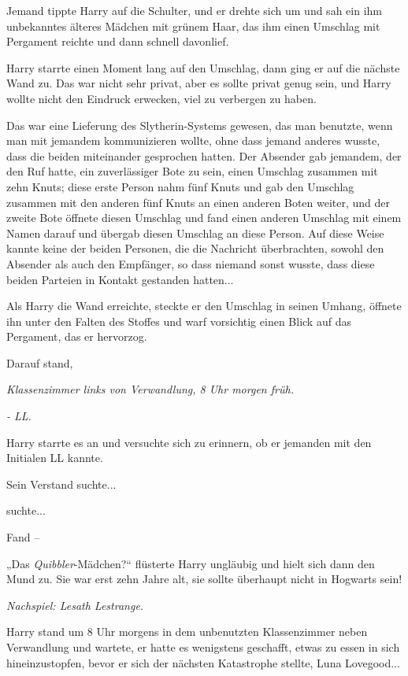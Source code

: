 {Jemand tippte Harry auf die Schulter, und er drehte sich um und sah ein ihm unbekanntes älteres Mädchen mit grünem Haar, das ihm einen Umschlag mit Pergament reichte und dann schnell davonlief.

Harry starrte einen Moment lang auf den Umschlag, dann ging er auf die nächste Wand zu. Das war nicht sehr privat, aber es sollte privat genug sein, und Harry wollte nicht den Eindruck erwecken, viel zu verbergen zu haben.

Das war eine Lieferung des Slytherin-Systems gewesen, das man benutzte, wenn man mit jemandem kommunizieren wollte, ohne dass jemand anderes wusste, dass die beiden miteinander gesprochen hatten. Der Absender gab jemandem, der den Ruf hatte, ein zuverlässiger Bote zu sein, einen Umschlag zusammen mit zehn Knuts; diese erste Person nahm fünf Knuts und gab den Umschlag zusammen mit den anderen fünf Knuts an einen anderen Boten weiter, und der zweite Bote öffnete diesen Umschlag und fand einen anderen Umschlag mit einem Namen darauf und übergab diesen Umschlag an diese Person. Auf diese Weise kannte keine der beiden Personen, die die Nachricht überbrachten, sowohl den Absender als auch den Empfänger, so dass niemand sonst wusste, dass diese beiden Parteien in Kontakt gestanden hatten...

Als Harry die Wand erreichte, steckte er den Umschlag in seinen Umhang, öffnete ihn unter den Falten des Stoffes und warf vorsichtig einen Blick auf das Pergament, das er hervorzog.

Darauf stand,

\emph{\emph{Klassenzimmer links von Verwandlung, 8 Uhr morgen} \emph{früh.}}

\emph{\emph{- LL.}}

Harry starrte es an und versuchte sich zu erinnern, ob er jemanden mit den Initialen LL kannte.

Sein Verstand suchte...

suchte...

Fand --

„Das \emph{Quibbler}-Mädchen?“ flüsterte Harry ungläubig und hielt sich dann den Mund zu. Sie war erst zehn Jahre alt, sie sollte überhaupt nicht in Hogwarts sein!

\emph{\emph{Nachspiel: Lesath Lestrange.}}

Harry stand um 8 Uhr morgens in dem unbenutzten Klassenzimmer neben Verwandlung und wartete, er hatte es wenigstens geschafft, etwas zu essen in sich hineinzustopfen, bevor er sich der nächsten Katastrophe stellte, Luna Lovegood...

}
